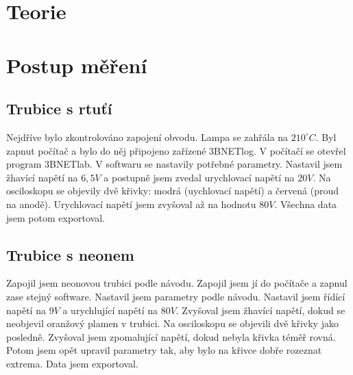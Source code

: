 \documentclass{article}
\begin{document}
\section{Teorie}
\section{Postup měření}
\subsection{Trubice s rtuťí}
Nejdříve bylo zkontrolováno zapojení obvodu.
Lampa se zahřála na $210 ^{\circ} C$. Byl zapnut počítač a bylo do něj připojeno zařízené 3BNETlog.
V počítačí se otevřel program 3BNETlab. V softwaru se nastavily potřebné parametry.
Nastavil jsem žhavící napětí na $6,5 V$ a postupně jsem zvedal urychlovací napětí na $20V$.
Na osciloskopu se objevily dvě křivky: modrá (uychlovací napětí) a červená (proud na anodě).
Urychlovací napětí jsem zvyšoval až na hodnotu $80V$.
Všechna data jsem potom exportoval.
\subsection{Trubice s neonem}
Zapojil jsem neonovou trubici podle návodu.
Zapojil jsem jí do počítače a zapnul zase stejný software.
Nastavil jsem parametry podle návodu.
Nastavil jsem řídící napětí na $9V$ a urychlující napětí na $80V$.
Zvyšoval jsem žhavící napětí, dokud se neobjevil oranžový plamen v trubici.
Na osciloskopu se objevili dvě křivky jako posledně.
Zvyšoval jsem zpomalující napětí, dokud nebyla křivka téměř rovná.
Potom jsem opět upravil parametry tak, aby bylo na křivce dobře rozeznat extrema.
Data jsem exportoval.
\end{document}
